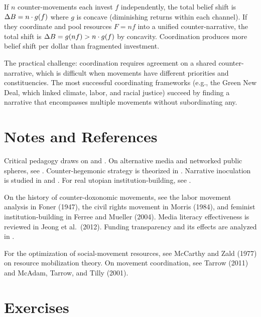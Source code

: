 \begin{proposition}
\label{prop:coordination}
If $n$ counter-movements each invest $f$ independently, the total belief shift is $\Delta B_{} = n \cdot g(f)$ where $g$ is concave (diminishing returns within each channel).
If they coordinate and pool resources $F = nf$ into a unified counter-narrative, the total shift is $\Delta B_{} = g(nf) > n \cdot g(f)$ by concavity.
Coordination produces more belief shift per dollar than fragmented investment.
\end{proposition}

The practical challenge: coordination requires agreement on a shared counter-narrative, which is difficult when movements have different priorities and constituencies.
The most successful coordinating frameworks (e.g., the Green New Deal, which linked climate, labor, and racial justice) succeed by finding a narrative that encompasses multiple movements without subordinating any.

\section{Notes and References}
\label{sec:ch31-notes}

Critical pedagogy draws on \textcite{freire1968} and \textcite{illich1971}.
On alternative media and networked public spheres, see \textcite{benkler2006}.
Counter-hegemonic strategy is theorized in \textcite{gramsci1971}.
Narrative inoculation is studied in \textcite{mcguire1964} and \textcite{vanderlinden2022}.
For real utopian institution-building, see \textcite{wright2010}.

On the history of counter-doxonomic movements, see the labor movement analysis in Foner (1947), the civil rights movement in Morris (1984), and feminist institution-building in Ferree and Mueller (2004).
Media literacy effectiveness is reviewed in Jeong et al.\ (2012).
Funding transparency and its effects are analyzed in \textcite{mayer2016}.

For the optimization of social-movement resources, see McCarthy and Zald (1977) on resource mobilization theory.
On movement coordination, see Tarrow (2011) and McAdam, Tarrow, and Tilly (2001).

\section{Exercises}

